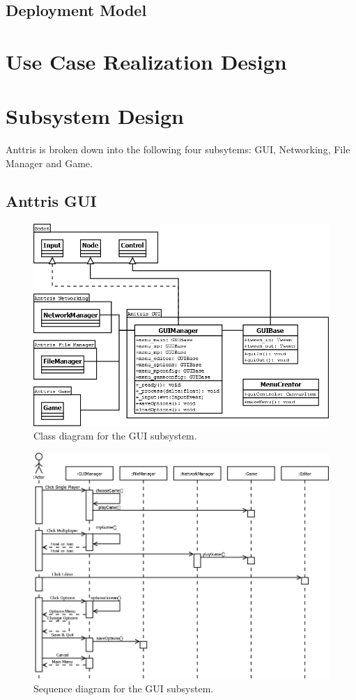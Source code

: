 \documentclass[12pt]{article}
\begin{document}
\subsection{Deployment Model}
\section{Use Case Realization Design}
\section{Subsystem Design} %
Anttris is broken down into the following four subsytems: GUI, Networking, File Manager and Game.
\subsection{Anttris GUI} %
    \begin{figure}[H]
        \centering
        \includegraphics[width=6in]{Anttris_GUIClass.png}
        \caption{Class diagram for the GUI subsystem.}
    \end{figure}
    \begin{figure}[H]
        \centering
        \includegraphics[width=6in]{Anttris_GUISequence.png}
        \caption{Sequence diagram for the GUI subsystem.}
    \end{figure}
    
\end{document}
